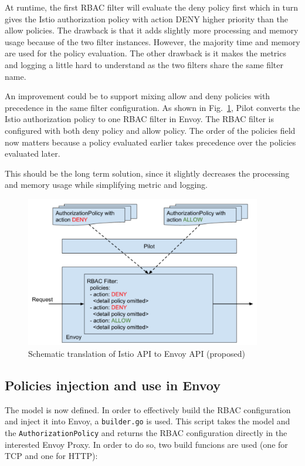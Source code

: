 At runtime, the first RBAC filter will evaluate the deny policy first which in turn gives the Istio authorization policy with action DENY higher priority than the allow policies.
The drawback is that it adds slightly more processing and memory usage because of the two filter instances. However, the majority time and memory are used for the policy evaluation.
The other drawback is it makes the metrics and logging a little hard to understand as the two filters share the same filter name.

An improvement could be to support mixing allow and deny policies with precedence in the same filter configuration. As shown in Fig.~\ref{fig:rbac-filter2}, Pilot converts the Istio authorization policy to one RBAC filter in Envoy. The RBAC filter is configured with both deny policy and allow policy. The order of the policies field now matters because a policy evaluated earlier takes precedence over the policies evaluated later.

This should be the long term solution, since it slightly decreases the processing and memory usage while simplifying metric and logging.


\begin{figure}[ht]
    \centering
    \includegraphics[width=0.92\textwidth]{chapters/images/chp3/rbac-filter2.png}
    \caption{Schematic translation of Istio API to Envoy API (proposed)}
    \label{fig:rbac-filter2}
\end{figure}

\subsection{Policies injection and use in Envoy}
The model is now defined. In order to effectively build the RBAC configuration and inject it into Envoy, a \texttt{builder.go} is used. This script takes the model and the \texttt{AuthorizationPolicy} and returns the RBAC configuration directly in the interested Envoy Proxy. In order to do so, two build funcions are used (one for TCP and one for HTTP):


